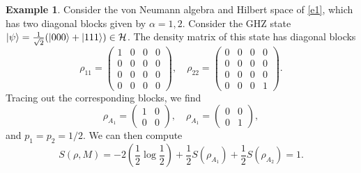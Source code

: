 \documentclass[12pt,a4paper]{report}
\numberwithin{equation}{section}
\theoremstyle{definition}
\theoremstyle{theorem}
\theoremstyle{theorem}
\theoremstyle{example}
\newtheorem{example}{Example}[section]
\theoremstyle{definition}
\begin{document}
\begin{example}
	Consider the von Neumann algebra and Hilbert space of \ref{e1}, which has two diagonal blocks given by $\alpha=1,2$. Consider the GHZ state $\ket{\psi}=\frac{1}{\sqrt{2}}(\ket{000}+\ket{111})\in\mathcal{H}$. The density matrix of this state has diagonal blocks
	\begin{equation}
		\rho_{11}=\begin{pmatrix}
			1&0&0&0\\
			0&0&0&0\\
			0&0&0&0\\
			0&0&0&0
		\end{pmatrix},\quad\rho_{22}=\begin{pmatrix}
		0&0&0&0\\
		0&0&0&0\\
		0&0&0&0\\
		0&0&0&1
	\end{pmatrix}.
	\end{equation}
	Tracing out the corresponding blocks, we find
	\begin{equation}
		\rho_{A_{1}}=\begin{pmatrix}1&0\\0&0\end{pmatrix},\quad\rho_{A_{1}}=\begin{pmatrix}0&0\\0&1\end{pmatrix},
	\end{equation}
	and $p_{1}=p_{2}=1/2$. We can then compute
	\begin{equation}
		S(\rho,M)=-2\left(\frac{1}{2}\log\frac{1}{2}\right)+\frac{1}{2}S(\rho_{A_{1}})+\frac{1}{2}S(\rho_{A_{2}})=1.
	\end{equation}
\end{example}
\end{document}
